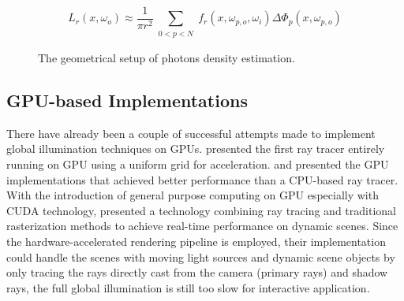 \begin{equation}
L_r(x, \omega_{o}) \approx \frac{1}{\pi r^{2}}\sum_{\substack{0<p<N}}f_{r}(x, \omega_{p, o}, \omega_{i})\Delta \Phi_{p}(x,\omega_{p, o})
\label{eq:photon_estimate}
\end{equation}

\begin{figure}[ftp]
    \centering
    \renewcommand{\thefigure}{\thechapter.\arabic{figure}}
    \caption[Photon Density Estimation Model]{The geometrical setup of photons density estimation.}
    \label{fig:photon_density_estimate}
\end{figure}

\subsection{GPU-based Implementations}
There have already been a couple of successful attempts made to implement global illumination techniques on GPUs. \citeauthor{Purcell:2002:RTP:566654.566640} \cite{Purcell:2002:RTP:566654.566640} presented the first ray tracer entirely running on GPU using a uniform grid for acceleration. \cite{Horn:2007:IKT:1230100.1230129} and \cite{Popov2007} presented the GPU implementations that achieved better performance than a CPU-based ray tracer. With the introduction of general purpose computing on GPU especially with CUDA technology, \citeauthor{Luebke2008} \cite{Luebke2008} presented a technology combining ray tracing and traditional rasterization methods to achieve real-time performance on dynamic scenes. Since the hardware-accelerated rendering pipeline is employed, their implementation could handle the scenes with moving light sources and dynamic scene objects by only tracing the rays directly cast from the camera (primary rays) and shadow rays, the full global illumination is still too slow for interactive application.


